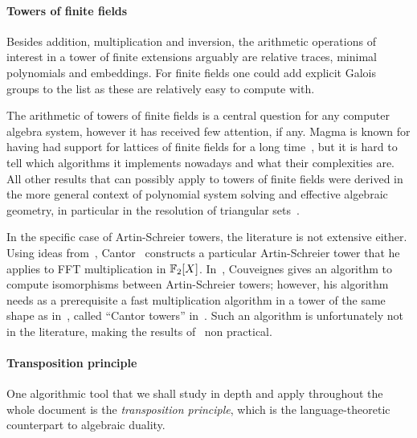\paragraph*{Towers of finite fields}
Besides addition, multiplication and inversion, the arithmetic
operations of interest in a tower of finite extensions arguably are
relative traces, minimal polynomials and embeddings. For finite fields
one could add explicit Galois groups to the list as these are
relatively easy to compute with.

The arithmetic of towers of finite fields is a central question for
any computer algebra system, however it has received few attention, if
any. Magma is known for having had support for lattices of finite
fields for a long time~\cite{bosma+cannon+steel97}, but it is hard to
tell which algorithms it implements nowadays and what their
complexities are. All other results that can possibly apply to towers
of finite fields were derived in the more general context of
polynomial system solving and effective algebraic geometry, in
particular in the resolution of triangular
sets~\cite{diaz+gonzalez01,giusti+lecerf+salvy01,bostan+salvy+schost03,pascal+schost06,li+moreno+schost07,dahan+jin+moreno+schost08,boulier+lemaire+moreno01,FGLM,rouiller99,alonso+becker+roy+wormann}.

In the specific case of Artin-Schreier towers, the literature is not
extensive either.  Using ideas from~\cite{Conway:ONAG2000},
Cantor~\cite{cantor89} constructs a particular Artin-Schreier tower
that he applies to FFT multiplication in
$\mathbb{F}_2[X]$. In~\cite{couveignes00}, Couveignes gives an algorithm to
compute isomorphisms between Artin-Schreier towers; however, his
algorithm needs as a prerequisite a fast multiplication algorithm in a
tower of the same shape as in~\cite{cantor89}, called ``Cantor
towers'' in~\cite{couveignes00}. Such an algorithm is unfortunately
not in the literature, making the results of~\cite{couveignes00} non
practical.


\paragraph*{Transposition principle}
One algorithmic tool that we shall study in depth and apply throughout
the whole document is the \emph{transposition principle}, which is the
language-theoretic counterpart to algebraic duality.

